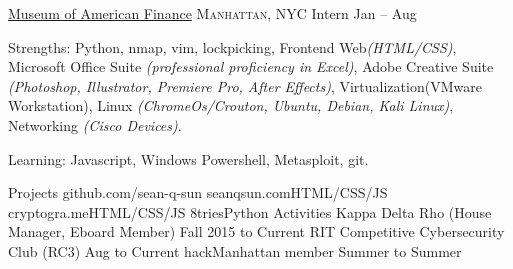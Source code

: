 \documentclass[10pt,a4paper]{article}
\begin{document}
\headedsection  %
  {\href{http://www.moaf.org/about/people/meyers_chris}{Museum of American Finance}}
  {\textsc{Manhattan, NYC}} {
  \headedsubsection
    {Intern}
    {Jan  -- Aug }
    {}
}

\spacedhrule{0em}{-0.4em}

\inlineheadsection  %
  {Strengths:}
  {Python, nmap, vim, lockpicking, Frontend Web\emph{(HTML/CSS)}, Microsoft Office Suite \emph{(professional proficiency in Excel)}, Adobe Creative Suite \emph{(Photoshop, Illustrator, Premiere Pro, After Effects)}, Virtualization(VMware Workstation), Linux \emph{(ChromeOs/Crouton, Ubuntu, Debian, Kali Linux)}, Networking \emph{(Cisco Devices)}.}

\nobreakvspace{.3em}
\inlineheadsection
  {Learning:}
  {Javascript, Windows Powershell, Metasploit, git.}

\nobreakvspace{1em}

\spacedhrule{0em}{-0.4em}
\headedsection 
  {Projects}
  {github.com/sean-q-sun} {
  \headedsubsection
    {seanqsun.com}{HTML/CSS/JS}
    {}
  \headedsubsection
    {cryptogra.me}{HTML/CSS/JS}
    {}
  \headedsubsection
    {8tries}{Python}
    {}
}
\headedsection
  {Activities}{}
  {
  \headedsubsection
  {Kappa Delta Rho (House Manager, Eboard Member)}
  {Fall 2015 to Current}{}
  \headedsubsection
  {RIT Competitive Cybersecurity Club (RC3)}
  {Aug  to Current}{}
  \headedsubsection
  {hackManhattan member}
  {Summer  to Summer }{}
}
\end{document}
